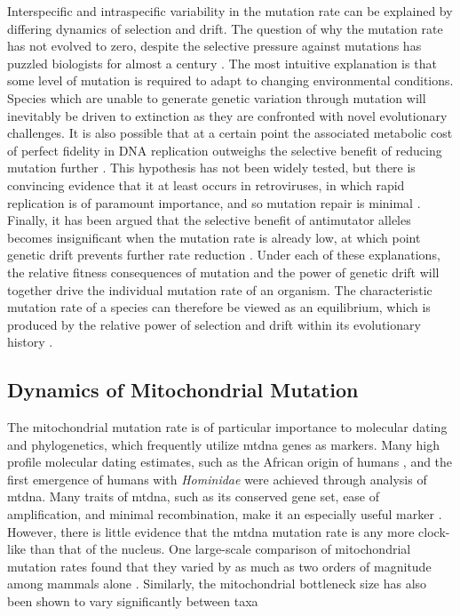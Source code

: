 \documentclass[12pt,twoside]{reedthesis}
\begin{document}
Interspecific and intraspecific variability in the mutation rate can be explained by differing dynamics of selection and drift.
The question of why the mutation rate has not evolved to zero, despite the selective pressure against mutations has puzzled biologists for almost a century \citep{sturtevant_effects_1937}.
The most intuitive explanation is that some level of mutation is required to adapt to changing environmental conditions.
Species which are unable to generate genetic variation through mutation will inevitably be driven to extinction as they are confronted with novel evolutionary challenges.
It is also possible that at a certain point the associated metabolic cost of perfect fidelity in DNA replication outweighs the selective benefit of reducing mutation further \citep{baer_mutation_2007}.
This hypothesis has not been widely tested, but there is convincing evidence that it at least occurs in retroviruses, in which rapid replication is of paramount importance, and so mutation repair is minimal \citep{furio_cost_2005,lloyd_high_2014}. %
Finally, it has been argued that the selective benefit of antimutator alleles becomes insignificant when the mutation rate is already low, at which point genetic drift prevents further rate reduction \citep{lynch_lower_2011}.
Under each of these explanations, the relative fitness consequences of mutation and the power of genetic drift will together drive the individual mutation rate of an organism.
The characteristic mutation rate of a species can therefore be viewed as an equilibrium, which is produced by the relative power of selection and drift within its evolutionary history \citep{kondrashov_modifiers_1995}.

\subsection{Dynamics of Mitochondrial Mutation}
The mitochondrial mutation rate is of particular importance to molecular dating and phylogenetics, which frequently utilize \gls{mtdna} genes as markers.
Many high profile molecular dating estimates, such as the African origin of humans \citep{maca-meyer_major_2001}, and the first emergence of humans with \textit{Hominidae} \citep{hasegawa_dating_1985} were achieved through analysis of \gls{mtdna}. 
Many traits of \gls{mtdna}, such as its conserved gene set, ease of amplification, and minimal recombination, make it an especially useful marker \citep{avise_intraspecific_1987}.
However, there is little evidence that the \gls{mtdna} mutation rate is any more clock-like than that of the nucleus.
One large-scale comparison of mitochondrial mutation rates found that they varied by as much as two orders of magnitude among mammals alone \citep{nabholz_strong_2008}.
Similarly, the mitochondrial bottleneck size has also been shown to vary significantly between taxa \citep{piganeau_evidence_2009}
\end{document}
